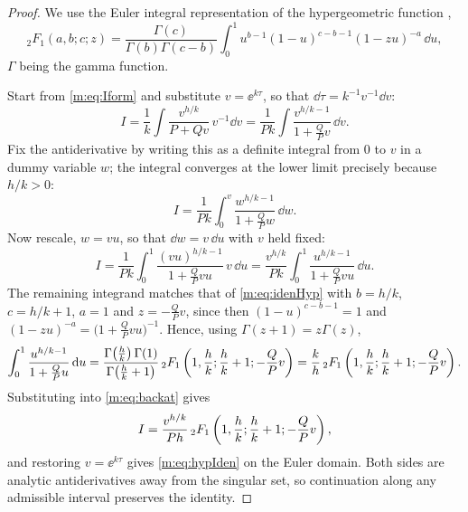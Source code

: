 \begin{proof}
We use the Euler integral representation of the hypergeometric function
\cite{Olver2010},
\begin{equation}
\label{m:eq:idenHyp}
{}_2F_1(a,b;c;z)
= \frac{\Gamma(c)}{\Gamma(b)\Gamma(c-b)}\int_0^1 u^{b-1}(1-u)^{c-b-1}(1-zu)^{-a}\,\dd u ,
\end{equation}
$\Gamma$ being the gamma function.

Start from \cref{m:eq:Iform} and substitute $v = \ee^{k\tau}$, so that
$\dd\tau = k^{-1}v^{-1}\dd v$:
\begin{equation*}
I = \frac1k\int\frac{v^{h/k}}{P+Qv}\,v^{-1}\dd v
= \frac{1}{Pk}\int\frac{v^{h/k-1}}{1+\frac{Q}{P}v}\,\dd v .
\end{equation*}
Fix the antiderivative by writing this as a definite integral from $0$ to $v$ in a
dummy variable $w$; the integral converges at the lower limit precisely because
$h/k>0$:
\begin{equation*}
I = \frac{1}{Pk}\int_0^v\frac{w^{h/k-1}}{1+\frac{Q}{P}w}\,\dd w .
\end{equation*}
Now rescale, $w = vu$, so that $\dd w = v\,\dd u$ with $v$ held fixed:
\begin{equation}
\label{m:eq:backat}
I = \frac{1}{Pk}\int_0^1\frac{(vu)^{h/k-1}}{1+\frac{Q}{P}vu}\,v\,\dd u
= \frac{v^{h/k}}{Pk}\int_0^1\frac{u^{h/k-1}}{1+\frac{Q}{P}vu}\,\dd u .
\end{equation}
The remaining integrand matches that of \cref{m:eq:idenHyp} with $b = h/k$,
$c = h/k+1$, $a=1$ and $z = -\tfrac{Q}{P}v$, since then $(1-u)^{c-b-1} = 1$ and
$(1-zu)^{-a} = \bigl(1+\tfrac{Q}{P}vu\bigr)^{-1}$. Hence, using
$\Gamma(z+1) = z\Gamma(z)$,
\begin{equation*}
\int_0^1\frac{u^{h/k-1}}{1+\frac{Q}{P}u}\,\mathrm{d} u
= \frac{\Gamma\!\left(\frac hk\right)\Gamma(1)}{\Gamma\!\left(\frac hk+1\right)}\,
{}_2F_1\left(1,\frac hk;\frac hk+1;-\frac QP v\right)
= \frac kh\,{}_2F_1\left(1,\frac hk;\frac hk+1;-\frac QP v\right).
\end{equation*}
Substituting into \cref{m:eq:backat} gives
\begin{equation*}
I = \frac{v^{h/k}}{Ph}\,{}_2F_1\left(1,\frac hk;\frac hk+1;-\frac QP v\right),
\end{equation*}
and restoring $v = \ee^{k\tau}$ gives \cref{m:eq:hypIden} on the Euler domain.
Both sides are analytic antiderivatives away from the singular set, so continuation
along any admissible interval preserves the identity.
\end{proof}

